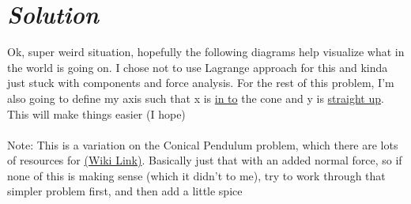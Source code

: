 \documentclass{article}
\begin{document}
\section*{\textit{Solution}} 
Ok, super weird situation, hopefully the following diagrams help visualize what in the world is going on. I chose not to use Lagrange approach for this and kinda just stuck with components and force analysis. For the rest of this problem, I'm also going to define my axis such that x is \underline{in to} the cone and y is \underline{straight up}. This will make things easier (I hope) \\ 
\\
Note: This is a variation on the Conical Pendulum problem, which there are lots of resources for \href{https://en.wikipedia.org/wiki/Conical_pendulum}{(Wiki Link)}. Basically just that with an added normal force, so if none of this is making sense (which it didn't to me), try to work through that simpler problem first, and then add a little spice
\end{document}
